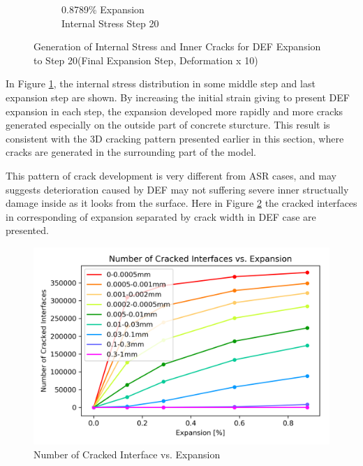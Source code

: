 \begin{figure}[h!]
\begin{subfigure}{.25\textwidth}
      \caption{0.8789\% Expansion\\Internal Stress Step 20}
    \end{subfigure}

    

\caption{Generation of Internal Stress and Inner Cracks for DEF Expansion to Step 20(Final Expansion Step, Deformation x 10)}
\label{fig:A30_X0C_stress}
\end{figure}

In Figure \ref{fig:A30_X0C_stress}, the internal stress distribution in some middle step and last expansion step are shown. By increasing the initial strain giving to present DEF expansion in each step, the expansion developed more rapidly and more cracks generated especially on the outside part of concrete sturcture. This result is consistent with the 3D cracking pattern presented earlier in this section, where cracks are generated in the surrounding part of the model.

This pattern of crack development is very different from ASR cases, and may suggests deterioration caused by DEF  may not suffering severe inner structually damage inside as it looks from the surface. Here in Figure \ref{A30X0CCRACK} the cracked interfaces in corresponding of expansion separated by crack width in DEF case are presented.

\begin{figure}[ht!]
\centering
\includegraphics[width=.8\linewidth]{Files/interface/A30X0CCRACK.png}
  \caption{Number of Cracked Interface vs. Expansion}
  \label{A30X0CCRACK}
\end{figure}
